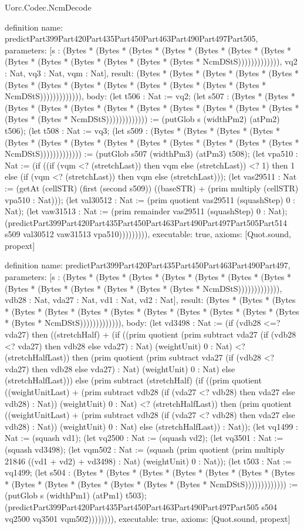 \begin{lexlean}{Uorc.Codec.NcmDecode}
\begin{semanticmodule}
definition{
  name: predictPart399Part420Part435Part450Part463Part490Part497Part505,
  parameters: [s : (Bytes * (Bytes * (Bytes * (Bytes * (Bytes * (Bytes * (Bytes * (Bytes * (Bytes * (Bytes * (Bytes * (Bytes * (Bytes * NcmDStS))))))))))))), vq2 : Nat, vq3 : Nat, vqm : Nat],
  result: (Bytes * (Bytes * (Bytes * (Bytes * (Bytes * (Bytes * (Bytes * (Bytes * (Bytes * (Bytes * (Bytes * (Bytes * (Bytes * NcmDStS))))))))))))),
  body: (let t506 : Nat := vq2; (let s507 : (Bytes * (Bytes * (Bytes * (Bytes * (Bytes * (Bytes * (Bytes * (Bytes * (Bytes * (Bytes * (Bytes * (Bytes * (Bytes * NcmDStS))))))))))))) := (putGlob s (widthPm2) (atPm2) t506); (let t508 : Nat := vq3; (let s509 : (Bytes * (Bytes * (Bytes * (Bytes * (Bytes * (Bytes * (Bytes * (Bytes * (Bytes * (Bytes * (Bytes * (Bytes * (Bytes * NcmDStS))))))))))))) := (putGlob s507 (widthPm3) (atPm3) t508); (let vpa510 : Nat := (if ((if (vqm <? (stretchLast)) then vqm else (stretchLast)) <? 1) then 1 else (if (vqm <? (stretchLast)) then vqm else (stretchLast))); (let vas29511 : Nat := (getAt (cellSTR) (first (second s509)) ((baseSTR) + (prim multiply (cellSTR) vpa510 : Nat))); (let val30512 : Nat := (prim quotient vas29511 (squashStep) 0 : Nat); (let vaw31513 : Nat := (prim remainder vas29511 (squashStep) 0 : Nat); (predictPart399Part420Part435Part450Part463Part490Part497Part505Part514 s509 val30512 vaw31513 vpa510))))))))),
  executable: true,
  axioms: [Quot.sound, propext]
}

definition{
  name: predictPart399Part420Part435Part450Part463Part490Part497,
  parameters: [s : (Bytes * (Bytes * (Bytes * (Bytes * (Bytes * (Bytes * (Bytes * (Bytes * (Bytes * (Bytes * (Bytes * (Bytes * (Bytes * NcmDStS))))))))))))), vdb28 : Nat, vda27 : Nat, vd1 : Nat, vd2 : Nat],
  result: (Bytes * (Bytes * (Bytes * (Bytes * (Bytes * (Bytes * (Bytes * (Bytes * (Bytes * (Bytes * (Bytes * (Bytes * (Bytes * NcmDStS))))))))))))),
  body: (let vd3498 : Nat := (if (vdb28 <=? vda27) then ((stretchHalf) + (if ((prim quotient (prim subtract vda27 (if (vdb28 <? vda27) then vdb28 else vda27) : Nat) (weightUnit) 0 : Nat) <? (stretchHalfLast)) then (prim quotient (prim subtract vda27 (if (vdb28 <? vda27) then vdb28 else vda27) : Nat) (weightUnit) 0 : Nat) else (stretchHalfLast))) else (prim subtract (stretchHalf) (if ((prim quotient ((weightUnitLast) + (prim subtract vdb28 (if (vda27 <? vdb28) then vda27 else vdb28) : Nat)) (weightUnit) 0 : Nat) <? (stretchHalfLast)) then (prim quotient ((weightUnitLast) + (prim subtract vdb28 (if (vda27 <? vdb28) then vda27 else vdb28) : Nat)) (weightUnit) 0 : Nat) else (stretchHalfLast)) : Nat)); (let vq1499 : Nat := (squash vd1); (let vq2500 : Nat := (squash vd2); (let vq3501 : Nat := (squash vd3498); (let vqm502 : Nat := (squash (prim quotient (prim multiply 21846 ((vd1 + vd2) + vd3498) : Nat) (weightUnit) 0 : Nat)); (let t503 : Nat := vq1499; (let s504 : (Bytes * (Bytes * (Bytes * (Bytes * (Bytes * (Bytes * (Bytes * (Bytes * (Bytes * (Bytes * (Bytes * (Bytes * (Bytes * NcmDStS))))))))))))) := (putGlob s (widthPm1) (atPm1) t503); (predictPart399Part420Part435Part450Part463Part490Part497Part505 s504 vq2500 vq3501 vqm502)))))))),
  executable: true,
  axioms: [Quot.sound, propext]
}


\end{semanticmodule}
\end{lexlean}
